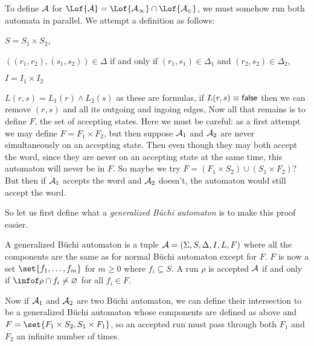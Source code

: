 To define ${\cal A}$ for $\Lof{\cal A}=\Lof{\cal A_1}\cap\Lof{\cal A_2}$, we must somehow run both automata in parallel.
We attempt a definition as follows:
\benum
    \item $S=S_1\times S_2$,
    \item $((r_1,r_2),(s_1,s_2))\in\Delta$ if and only if $(r_1,s_1)\in\Delta_1$ and $(r_2,s_2)\in\Delta_2$,
    \item $I=I_1\times I_2$
    \item $L(r,s)=L_1(r)\land L_2(s)$ as these are formulas, if $L(r,s)\equiv{\sf false}$ then we can remove $(r,s)$ and all its outgoing and ingoing edges,
\eenum
Now all that remains is to define $F$, the set of accepting states.
Here we must be careful: as a first attempt we may define $F=F_1\times F_2$, but then suppose ${\cal A}_1$ and ${\cal A}_2$ are never simultaneously on an accepting state.
Then even though they may both accept the word, since they are never on an accepting state at the same time, this automaton will never be in $F$.
So maybe we try $F=(F_1\times S_2)\cup(S_1\times F_2)$?
But then if ${\cal A}_1$ accepts the word and ${\cal A}_2$ doesn't, the automaton would still accept the word.

So let us first define what a {\it generalized B\"uchi automaton} is to make this proof easier.

\bdefn

    A {\emphcolor generalized B\"uchi automaton} is a tuple ${\cal A}=(\Sigma,S,\Delta,I,L,F)$ where all the components are the same as for normal B\"uchi automaton except for $F$.
    $F$ is now a set $\set{f_1,\dots,f_m}$ for $m\geq0$ where $f_i\subseteq S$.
    A run $\rho$ is accepted ${\cal A}$ if and only if $\infof\rho\cap f_i\neq\varnothing$ for all $f_i\in F$.

\edefn

Now if ${\cal A}_1$ and ${\cal A}_2$ are two B\"uchi automaton, we can define their intersection to be a generalized B\"uchi automaton whose components are defined as above and
$F=\set{F_1\times S_2,S_1\times F_1}$, so an accepted run must pass through both $F_1$ and $F_2$ an infinite number of times.

\bye


